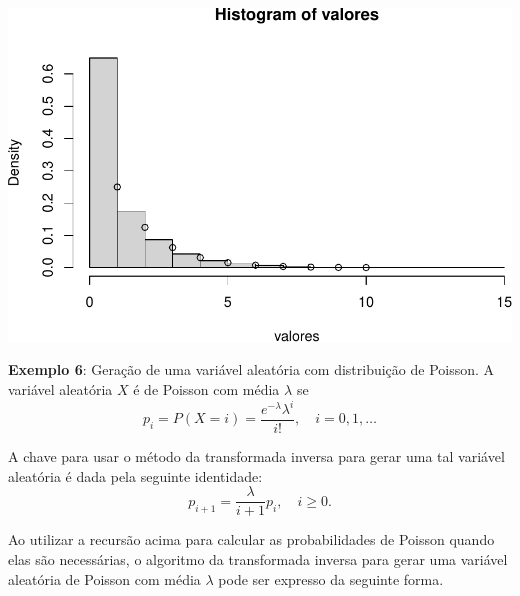 \documentclass[
]{book}
\begin{document}
\includegraphics{introR_files/figure-latex/unnamed-chunk-236-1.pdf}

\textbf{Exemplo 6}: Geração de uma variável aleatória com distribuição de
Poisson. A variável aleatória \(X\) é de Poisson com média \(\lambda\) se
\[p_{i} = P(X = i) = \frac{e^{-\lambda}\lambda^i}{i!}, \quad i=0,1,\ldots\]

A chave para usar o método da transformada inversa para gerar uma tal
variável aleatória é dada pela seguinte identidade:
\[p_{i+1}=\frac{\lambda}{i+1}p_{i}, \quad i\geq 0.\]

Ao utilizar a recursão acima para calcular as probabilidades de Poisson
quando elas são necessárias, o algoritmo da transformada inversa para
gerar uma variável aleatória de Poisson com média \(\lambda\) pode ser
expresso da seguinte forma.
\end{document}
